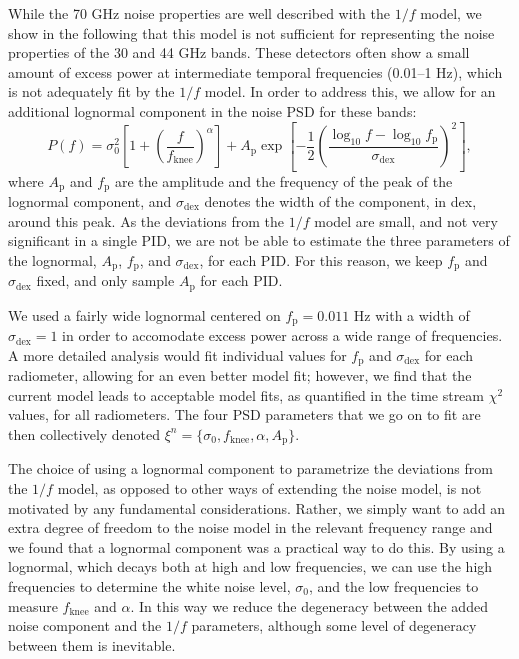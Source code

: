 \documentclass{aa}
\begin{document}
While the 70 GHz noise properties are well described with the $1/f$ model, we show in the following that this model is not sufficient for representing the noise properties of the 30 and 44 GHz bands. These detectors often show a small amount of excess power at intermediate temporal frequencies (0.01--1 Hz), which is not adequately fit by the $1/f$ model. In order to address this, we allow for an additional lognormal component in the noise PSD for these bands:
\begin{equation}
        P(f) = \sigma_0^2\left[1 +
        \left(\frac{f}{f_\mathrm{knee}}\right)^\alpha\right] + A_\mathrm{p} \exp\left[-\frac{1}{2}\left(\frac{\log_{10}f - \log_{10} f_\mathrm{p}}{\sigma_\mathrm{dex}}\right)^2\right],
        \label{eq:1fmodel_lognorm}
\end{equation} 
where $A_\mathrm{p}$ and $f_\mathrm{p}$ are the amplitude and the frequency of the peak of the lognormal component, and $\sigma_\mathrm{dex}$ denotes the width of the component, in dex, around this peak. As the deviations from the $1/f$ model are small, and not very significant in a single PID, we are not be able to estimate the three parameters of the lognormal, $A_\mathrm{p}$, $f_\mathrm{p}$,  and $\sigma_\mathrm{dex}$, for each PID. For this reason, we keep $f_\mathrm{p}$  and $\sigma_\mathrm{dex}$ fixed, and only sample $A_\mathrm{p}$ for each PID. 

We used a fairly wide lognormal centered on $f_\mathrm{p} = 0.011$ Hz with a width of $\sigma_\mathrm{dex} = 1$ in order to accomodate excess power across a wide range of frequencies. A more detailed analysis would fit individual values for $f_\mathrm{p}$  and $\sigma_\mathrm{dex}$ for each radiometer, allowing for an even better model fit; however, we find that the current model leads to acceptable model fits, as quantified in the time stream $\chi^2$ values, for all radiometers. The four PSD parameters that we go on to fit are then
collectively denoted $\xi^n = \{ \sigma_0, f_\mathrm{knee},\alpha, A_\mathrm{p}\}$. 

The choice of using a lognormal component to parametrize the deviations from the $1/f$ model, as opposed to other ways of extending the noise model, is not motivated by any fundamental considerations. Rather, we simply want to add an extra degree of freedom to the noise model in the relevant frequency range and we found that a lognormal component was a practical way to do this. By using a lognormal, which decays both at high and low frequencies, we can use the high frequencies to determine the white noise level, $\sigma_0$, and the low frequencies to measure $f_\mathrm{knee}$ and $\alpha$. In this way we reduce the degeneracy between the added noise component and the $1/f$ parameters, although some level of degeneracy between them is inevitable. 
\end{document}

